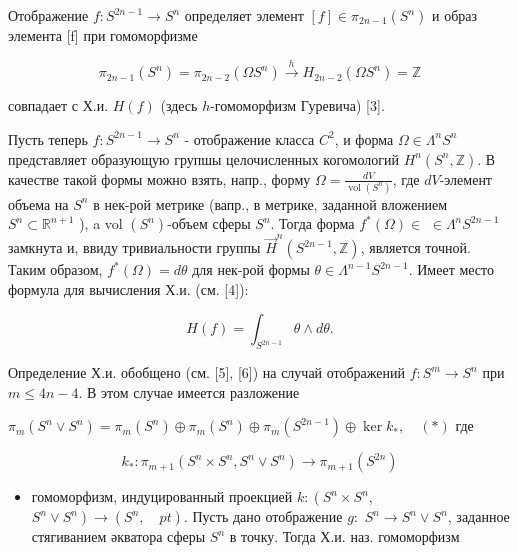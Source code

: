 \documentclass[10pt]{article}
\begin{document}
Отображение $f: S^{2 n-1} \longrightarrow S^{n}$ определяет элемент $[f] \in \pi_{2 n-1}\left(S^{n}\right)$ и образ элемента [f] при гомоморфизме



\[

\pi_{2 n-1}\left(S^{n}\right)=\pi_{2 n-2}\left(\Omega S^{n}\right) \stackrel{h}{\longrightarrow} H_{2 n-2}\left(\Omega S^{n}\right)=\mathbb{Z}

\]



совпадает с Х.и. $H(f)$ (здесь $h$-гомоморфизм Гуревича) [3].



Пусть теперь $f: S^{2 n-1} \longrightarrow S^{n}$ - отображение класса $C^{2}$, и форма $\Omega \in \Lambda^{n} S^{n}$ представляет образующую групшы целочисленных когомологий $H^{n}\left(S^{n}, \mathbb{Z}\right)$. В качестве такой формы можно взять, напр., форму $\Omega=\frac{d V}{\operatorname{vol}\left(S^{n}\right)}$, где $d V$-элемент объема на $S^{n}$ в нек-рой метрике (вапр., в метрике, заданной вложением $S^{n} \subset \mathbb{R}^{n+1}$ ), a vol $\left(S^{n}\right)$-объем сферы $S^{n}$. Тогда форма $f^{*}(\Omega) \in$ $\in \Lambda^{n} S^{2 n-1}$ замкнута и, ввиду тривиальности группы $\vec{H}^{n}\left(S^{2 n-1}, \mathbb{Z}\right)$, является точной. Таким образом, $f^{*}(\Omega)=d \theta$ для нек-рой формы $\theta \in \Lambda^{n-1} S^{2 n-1}$. Имеет место формула для вычисления Х.и. (см. [4]):



\[

H(f)=\int_{S^{2 n-1}} \theta \wedge d \theta .

\]



Определение Х.и. обобщено (см. [5], [6]) на случай отображений $f: S^{m} \longrightarrow S^{n}$ при $m \leqslant 4 n-4$. В этом случае имеется разложение



$\pi_{m}\left(S^{n} \vee S^{n}\right)=\pi_{m}\left(S^{n}\right) \oplus \pi_{m}\left(S^{n}\right) \oplus \pi_{m}\left(S^{2 n-1}\right) \oplus \operatorname{ker} k_{*}, \quad(*)$ где



\[

k_{*}: \pi_{m+1}\left(S^{n} \times S^{n}, S^{n} \vee S^{n}\right) \rightarrow \pi_{m+1}\left(S^{2 n}\right)

\]



\begin{itemize}

  \item гомоморфизм, индуцированный проекцией $k:\left(S^{n} \times S^{n}\right.$, $\left.S^{n} \vee S^{n}\right) \longrightarrow\left(S^{n}, \quad p t\right)$. Пусть дано отображение $g:$ $S^{n} \longrightarrow S^{n} \vee S^{n}$, заданное стягиванием әкватора сферы $S^{n}$ в точку. Тогда Х.и. наз. гомоморфизм

\end{itemize}
\end{document}
